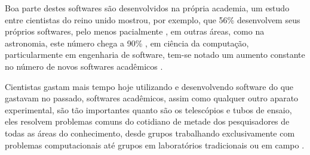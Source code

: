 \cite{segal2008developing}

%

Boa parte destes softwares são desenvolvidos na própria academia, um estudo
entre cientistas do reino unido mostrou, por exemplo, que 56\% desenvolvem seus próprios
softwares, pelo menos pacialmente \cite{hettrick_2014_14809}, em outras áreas,
como na astronomia, este número chega a 90\%
\cite{momcheva2015software}, em ciência da computação, particularmente em
engenharia de software, tem-se notado um aumento constante no número de novos
softwares acadêmicos \cite{allen2017engineering}.

Cientistas gastam mais tempo hoje utilizando e desenvolvendo
software do que gastavam no passado, softwares acadêmicos, assim como
qualquer outro aparato experimental, são tão importantes quanto
são os telescópios e tubos de ensaio, eles resolvem problemas comuns do
cotidiano de metade dos pesquisadores de todas as áreas do conhecimento, desde grupos
trabalhando exclusivamente com problemas computacionais até grupos em
laboratórios tradicionais ou em campo \cite{wilson2014best}.

%
%

%
%
%

